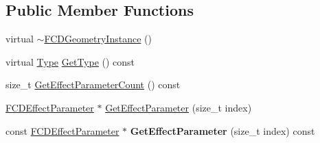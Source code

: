 \subsection*{Public Member Functions}
\begin{DoxyCompactItemize}
\item 
virtual \hyperlink{classFCDGeometryInstance_ac57bc9a80e16e9fb3f6869c797d41a10}{$\sim$FCDGeometryInstance} ()
\item 
virtual \hyperlink{classFCDEntityInstance_a82e95eec7d9242bbedb336b0d35b59d3}{Type} \hyperlink{classFCDGeometryInstance_a6125c229bbac52a27ae4a1fa8cd0dac6}{GetType} () const 
\item 
size\_\-t \hyperlink{classFCDGeometryInstance_ade08b466ff86c4d1d4ced39a694d5a23}{GetEffectParameterCount} () const 
\item 
\hyperlink{classFCDEffectParameter}{FCDEffectParameter} $\ast$ \hyperlink{classFCDGeometryInstance_a07074f218e61128d9c53d9a8bedda444}{GetEffectParameter} (size\_\-t index)
\item 
\hypertarget{classFCDGeometryInstance_ac60032c190042f2450d53f1ae781f9e4}{
const \hyperlink{classFCDEffectParameter}{FCDEffectParameter} $\ast$ {\bfseries GetEffectParameter} (size\_\-t index) const }
\label{classFCDGeometryInstance_ac60032c190042f2450d53f1ae781f9e4}


\end{DoxyCompactItemize}
